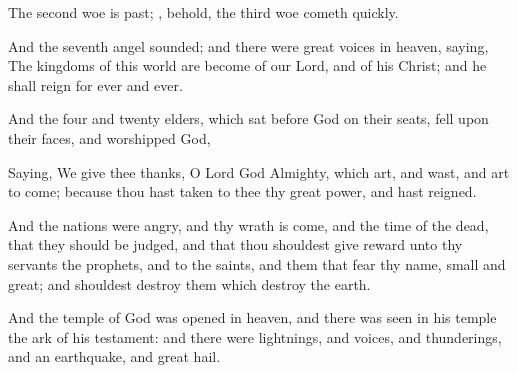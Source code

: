 {The
second
woe is
past;
{},
behold, the
third
woe
cometh
quickly.

And the
seventh
angel
sounded;
and there
were
great
voices
in
heaven,
saying, The
kingdoms of this
world are
become
{} of
our
Lord,
and of
his
Christ;
and he shall
reign
for
ever and
ever.

And the
four
and
twenty
elders, which
sat
before
God
on
their
seats,
fell
upon
their
faces,
and
worshipped
God,

Saying, We
give
thee
thanks, O
Lord
God
Almighty, which
art,
and
wast,
and art to
come;
because thou hast taken to
thee
thy
great
power,
and hast
reigned.

And the
nations were
angry,
and
thy
wrath is
come,
and the
time of the
dead, that they should be
judged,
and that thou shouldest
give
reward unto
thy
servants the
prophets,
and to the
saints,
and
them that
fear
thy
name,
small
and
great;
and shouldest
destroy
them which
destroy the
earth.

And the
temple of
God was
opened
in
heaven,
and there was
seen
in
his
temple the
ark of
his
testament:
and there
were
lightnings,
and
voices,
and
thunderings,
and an
earthquake,
and
great
hail.




\par }
